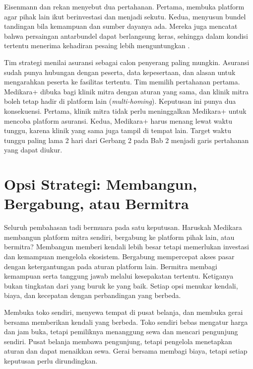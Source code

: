 Eisenmann dan rekan menyebut dua pertahanan. Pertama, membuka platform agar pihak lain ikut berinvestasi
dan menjadi sekutu. Kedua, menyusun bundel tandingan bila kemampuan dan sumber dayanya ada. Mereka juga
mencatat bahwa persaingan antarbundel dapat berlangsung keras, sehingga dalam kondisi tertentu menerima
kehadiran pesaing lebih menguntungkan \cite{c03-eisenmann2010envelopmentwp}.

\begin{kasus}[title={Kasus Medikara Health: Membaca Risiko dari Pihak Asuransi}]
Tim strategi menilai asuransi sebagai calon penyerang paling mungkin. Asuransi sudah punya hubungan dengan
peserta, data kepesertaan, dan alasan untuk mengarahkan peserta ke fasilitas tertentu. Tim memilih pertahanan pertama. Medikara+ dibuka bagi klinik mitra dengan aturan yang sama, dan klinik mitra
boleh tetap hadir di platform lain (\textit{multi-homing}). Keputusan ini punya dua konsekuensi. Pertama,
klinik mitra tidak perlu meninggalkan Medikara+ untuk mencoba platform asuransi. Kedua, Medikara+ harus
menang lewat waktu tunggu, karena klinik yang sama juga tampil di tempat lain. Target waktu tunggu paling
lama 2 hari dari Gerbang 2 pada Bab 2 menjadi garis pertahanan yang dapat diukur.
\end{kasus}

\section{Opsi Strategi: Membangun, Bergabung, atau Bermitra}

Seluruh pembahasan tadi bermuara pada satu keputusan. Haruskah Medikara membangun platform mitra sendiri,
bergabung ke platform pihak lain, atau bermitra? Membangun memberi kendali lebih besar tetapi memerlukan investasi dan kemampuan mengelola ekosistem.
Bergabung mempercepat akses pasar dengan ketergantungan pada aturan platform lain. Bermitra membagi
kemampuan serta tanggung jawab melalui kesepakatan tertentu. Ketiganya bukan tingkatan dari yang buruk ke
yang baik. Setiap opsi menukar kendali, biaya, dan kecepatan dengan perbandingan yang berbeda.

Membuka toko sendiri, menyewa tempat di pusat belanja, dan membuka gerai bersama memberikan kendali yang
berbeda. Toko sendiri bebas mengatur harga dan jam buka, tetapi pemiliknya menanggung sewa dan mencari
pengunjung sendiri. Pusat belanja membawa pengunjung, tetapi pengelola menetapkan aturan dan dapat menaikkan
sewa. Gerai bersama membagi biaya, tetapi setiap keputusan perlu dirundingkan.

